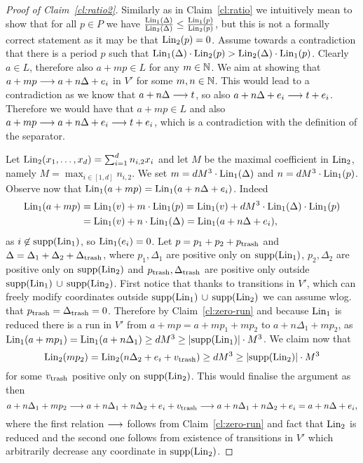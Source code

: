 \begin{proof}[Proof of Claim~\ref{cl:ratio2}]
Similarly as in Claim~\ref{cl:ratio} we intuitively mean to show that for all $p \in P$ we have
$\frac{\textup{Lin}_1(\Delta)}{\textup{Lin}_2(\Delta)} \leq \frac{\textup{Lin}_1(p)}{\textup{Lin}_2(p)}$, but this is not a formally correct
statement as it may be that $\textup{Lin}_2(p) = 0$.
Assume towards a contradiction that there is a period $p$ such
that $\textup{Lin}_1(\Delta) \cdot \textup{Lin}_2(p) > \textup{Lin}_2(\Delta) \cdot \textup{Lin}_1(p)$.
Clearly $a \in L$, therefore also $a + mp \in L$ for any $m \in \mathbb{N}$.
We aim at showing that $a + mp \longrightarrow a + n\Delta + e_i$ in $V'$ for some $m, n \in \mathbb{N}$.
This would lead to a contradiction as we know that $a + n\Delta \longrightarrow t$, so also
$a + n\Delta + e_i \longrightarrow t+e_i$. Therefore we would have that $a + mp \in L$ and
also $a + mp \longrightarrow a + n\Delta + e_i \longrightarrow t + e_i$, which is a contradiction
with the definition of the separator.

Let $\textup{Lin}_2(x_1, \ldots, x_d) = \sum_{i=1}^d n_{i,2} x_i$ and let $M$ be the maximal coefficient in $\textup{Lin}_2$,
namely $M = \max_{i \in [1,d]} n_{i,2}$. We set $m = dM^3 \cdot \textup{Lin}_1(\Delta)$ and $n = dM^3 \cdot \textup{Lin}_1(p)$.
Observe now that $\textup{Lin}_1(a + mp) = \textup{Lin}_1(a + n\Delta + e_i)$.
Indeed
\begin{align*}
\textup{Lin}_1(a + mp) & = \textup{Lin}_1(v) + m \cdot \textup{Lin}_1(p) = \textup{Lin}_1(v) + dM^3 \cdot \textup{Lin}_1(\Delta) \cdot \textup{Lin}_1(p) \\
& = \textup{Lin}_1(v) + n \cdot \textup{Lin}_1(\Delta) = \textup{Lin}_1(a + n\Delta + e_i),
\end{align*}
as $i \not\in \textup{supp}(\textup{Lin}_1)$, so $\textup{Lin}_1(e_i) = 0$.
Let $p = p_1 + p_2 + p_{\textup{trash}}$ and $\Delta = \Delta_1 + \Delta_2 + \Delta_{\textup{trash}}$,
where $p_1, \Delta_1$ are positive only on $\textup{supp}(\textup{Lin}_1)$,
$p_2, \Delta_2$ are positive only on $\textup{supp}(\textup{Lin}_2)$
and $p_{\textup{trash}}, \Delta_{\textup{trash}}$ are positive only outside $\textup{supp}(\textup{Lin}_1) \, \cup \, \textup{supp}(\textup{Lin}_2)$.
First notice that thanks to transitions in $V'$, which can freely modify coordinates outside $\textup{supp}(\textup{Lin}_1) \, \cup \, \textup{supp}(\textup{Lin}_2)$
we can assume wlog. that $p_{\textup{trash}} = \Delta_{\textup{trash}} = 0$.
Therefore by Claim~\ref{cl:zero-run} and because $\textup{Lin}_1$ is reduced there is a run in $V'$ from $a + mp = a + mp_1 + mp_2$
to $a + n \Delta_1 + mp_2$, as $\textup{Lin}_1(a + mp_1) = \textup{Lin}_1(a + n \Delta_1) \geq dM^3 \geq |\textup{supp}(\textup{Lin}_1)| \cdot M^3$.
We claim now that
\begin{equation}\label{eq:needed}
\textup{Lin}_2(mp_2) = \textup{Lin}_2(n \Delta_2 + e_i + v_{\textup{trash}}) \geq dM^3 \geq |\textup{supp}(\textup{Lin}_2)| \cdot M^3
\end{equation}
for some $v_{\textup{trash}}$ positive only on $\textup{supp}(\textup{Lin}_2)$.
This would finalise the argument as then
\[
a + n \Delta_1 + mp_2 \longrightarrow a + n \Delta_1 + n \Delta_2 + e_i + v_{\textup{trash}} \longrightarrow a + n \Delta_1 + n \Delta_2 + e_i = a + n \Delta + e_i,
\]
where the first relation $\longrightarrow$ follows from Claim~\ref{cl:zero-run} and fact that $\textup{Lin}_2$ is reduced
and the second one follows from existence of transitions in $V'$ which arbitrarily decrease any coordinate in $\textup{supp}(\textup{Lin}_2)$.


\end{proof}

